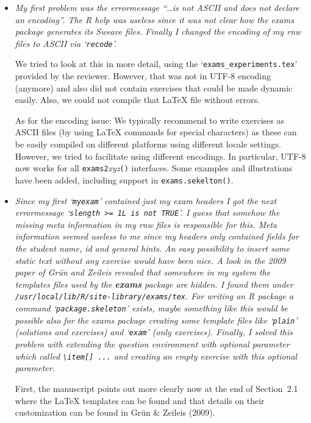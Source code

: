 \documentclass[a4paper]{article}
\begin{document}
\begin{itemize}
\item {\it
My first problem was the errormessage ``\dots is not ASCII and does not
declare an encoding''.  The R help was useless since it was not clear how
the exams package generates its Sweave files.  Finally I changed the
encoding of my rnw files to ASCII via `\texttt{recode}'.}

We tried to look at this in more detail, using the `\verb|exams_experiments.tex|'
provided by the reviewer. However, that was not in UTF-8 encoding (anymore)
and also did not contain exercises that could be made dynamic easily. Also,
we could not compile that {\LaTeX} file without errors.

As for the encoding issue: We typically recommend to write exercises as
ASCII files (by using {\LaTeX} commands for special characters) as these can
be easily compiled on different platforms using different locale settings.
However, we tried to facilitate using different encodings. In particular,
UTF-8 now works for all \texttt{exams2}\emph{xyz}\texttt{()} interfaces. Some examples and
illustrations have been added, including support in \texttt{exams.sekelton()}.

\item {\it
Since my first `\texttt{myexam}' contained just my exam headers I got the next
errormessage `\texttt{slength >= 1L is not TRUE}'.  I guess that somehow the
missing meta information in my rnw files is responsible for this.  Meta
information seemed useless to me since my headers only contained fields
for the student name, id and general hints.  An easy possibility to insert
some static text without any exercise would have been nice. A look in the
2009 paper of Gr\"un and Zeileis revealed that somewhere in my system the
templates files used by the \textbf{exams} package are hidden.  I found them
under \texttt{/usr/local/lib/R/site-library/exams/tex}.  For writing an R package
a command `\texttt{package.skeleton}' exists, maybe something like this would be
possible also for the exams package creating some template files like
`\texttt{plain}' (solutions and exercises) and `\texttt{exam}' (only exercises). Finally, I
solved this problem with extending the question environment with optional
parameter which called \verb|\item[] ...|  and creating an empty exercise with
this optional parameter.}

First, the manuscript points out more clearly now at the end of Section~2.1
where the {\LaTeX} templates can be found and that details on their customization
can be found in Gr\"un \& Zeileis (2009).


\end{itemize}
\end{document}
